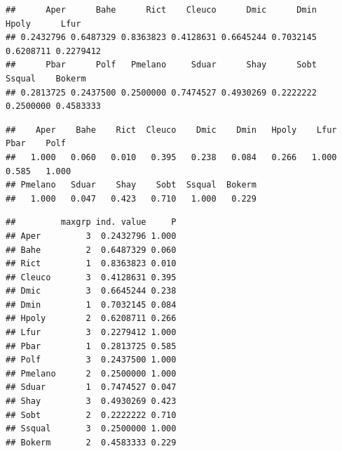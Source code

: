 \documentclass[
]{book}
\newenvironment{Shaded}{\begin{snugshade}}{\end{snugshade}}
\newcommand{\KeywordTok}[1]{\textcolor[rgb]{0.13,0.29,0.53}{\textbf{#1}}}
\newcommand{\NormalTok}[1]{#1}
\newcommand{\OperatorTok}[1]{\textcolor[rgb]{0.81,0.36,0.00}{\textbf{#1}}}
\newcommand{\StringTok}[1]{\textcolor[rgb]{0.31,0.60,0.02}{#1}}
\begin{document}
\begin{Shaded}
\end{Shaded}

\begin{verbatim}
##      Aper      Bahe      Rict    Cleuco      Dmic      Dmin     Hpoly      Lfur 
## 0.2432796 0.6487329 0.8363823 0.4128631 0.6645244 0.7032145 0.6208711 0.2279412 
##      Pbar      Polf   Pmelano     Sduar      Shay      Sobt    Ssqual    Bokerm 
## 0.2813725 0.2437500 0.2500000 0.7474527 0.4930269 0.2222222 0.2500000 0.4583333
\end{verbatim}

\begin{Shaded}
\end{Shaded}

\begin{verbatim}
##    Aper    Bahe    Rict  Cleuco    Dmic    Dmin   Hpoly    Lfur    Pbar    Polf 
##   1.000   0.060   0.010   0.395   0.238   0.084   0.266   1.000   0.585   1.000 
## Pmelano   Sduar    Shay    Sobt  Ssqual  Bokerm 
##   1.000   0.047   0.423   0.710   1.000   0.229
\end{verbatim}

\begin{Shaded}
\end{Shaded}

\begin{verbatim}
##         maxgrp ind. value     P
## Aper         3  0.2432796 1.000
## Bahe         2  0.6487329 0.060
## Rict         1  0.8363823 0.010
## Cleuco       3  0.4128631 0.395
## Dmic         3  0.6645244 0.238
## Dmin         1  0.7032145 0.084
## Hpoly        2  0.6208711 0.266
## Lfur         3  0.2279412 1.000
## Pbar         1  0.2813725 0.585
## Polf         3  0.2437500 1.000
## Pmelano      2  0.2500000 1.000
## Sduar        1  0.7474527 0.047
## Shay         3  0.4930269 0.423
## Sobt         2  0.2222222 0.710
## Ssqual       3  0.2500000 1.000
## Bokerm       2  0.4583333 0.229
\end{verbatim}
\end{document}
